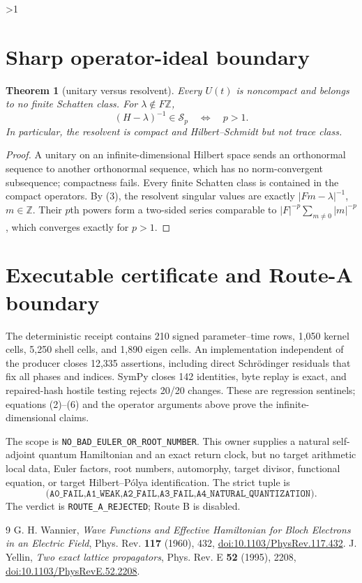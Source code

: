 \documentclass[10pt]{article}
\providecommand{\CRevisionRound}{2}
\newtheorem{theorem}{Theorem}
\newcommand{\Z}{\mathbb Z}
\begin{document}
\ifnum\CRevisionRound>1
\section{Sharp operator-ideal boundary}
\begin{theorem}[unitary versus resolvent]
Every $U(t)$ is noncompact and belongs to no finite Schatten class.
For $\lambda\notin F\Z$,
\[
 (H-\lambda)^{-1}\in\mathcal S_p\quad\Longleftrightarrow\quad p>1.
\]
In particular, the resolvent is compact and Hilbert--Schmidt but not trace
class.
\end{theorem}
\begin{proof}
A unitary on an infinite-dimensional Hilbert space sends an orthonormal
sequence to another orthonormal sequence, which has no norm-convergent
subsequence; compactness fails.  Every finite Schatten class is contained in
the compact operators.  By (3), the resolvent singular values are exactly
$|Fm-\lambda|^{-1}$, $m\in\Z$.  Their $p$th powers form a two-sided series
comparable to $|F|^{-p}\sum_{m\ne0}|m|^{-p}$, which converges exactly for
$p>1$.
\end{proof}

\section{Executable certificate and Route-A boundary}
The deterministic receipt contains 210 signed parameter--time rows, 1,050
kernel cells, 5,250 shell cells, and 1,890 eigen cells.  An implementation
independent of the producer closes 12,335 assertions, including direct
Schr\"odinger residuals that fix all phases and indices.  SymPy closes 142
identities, byte replay is exact, and repaired-hash hostile testing rejects
20/20 changes.  These are regression sentinels; equations (2)--(6) and the
operator arguments above prove the infinite-dimensional claims.

The scope is \texttt{NO\_BAD\_EULER\_OR\_ROOT\_NUMBER}.  This owner supplies
a natural self-adjoint quantum Hamiltonian and an exact return clock, but no
target arithmetic local data, Euler factors, root numbers, automorphy, target
divisor, functional equation, or target Hilbert--P\'olya identification.  The
strict tuple is
\[
\texttt{(A0\_FAIL,A1\_WEAK,A2\_FAIL,A3\_FAIL,A4\_NATURAL\_QUANTIZATION)}.
\]
The verdict is \texttt{ROUTE\_A\_REJECTED}; Route B is disabled.
\fi

\begin{thebibliography}{9}
 G. H. Wannier,
\emph{Wave Functions and Effective Hamiltonian for Bloch Electrons in an Electric Field},
Phys. Rev. \textbf{117} (1960), 432,
\href{https://doi.org/10.1103/PhysRev.117.432}{doi:10.1103/PhysRev.117.432}.
 J. Yellin, \emph{Two exact lattice propagators},
Phys. Rev. E \textbf{52} (1995), 2208,
\href{https://doi.org/10.1103/PhysRevE.52.2208}{doi:10.1103/PhysRevE.52.2208}.
\end{thebibliography}
\end{document}

